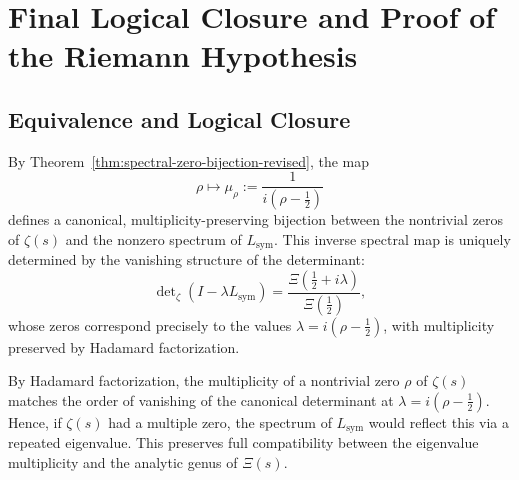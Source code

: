 \section{Final Logical Closure and Proof of the Riemann Hypothesis}
\label{sec:logical-closure}





\subsection{Equivalence and Logical Closure}




\begin{remark}
By Theorem~\ref{thm:spectral-zero-bijection-revised}, the map
\[
\rho \mapsto \mu_\rho := \frac{1}{i(\rho - \tfrac{1}{2})}
\]
defines a canonical, multiplicity-preserving bijection between the nontrivial zeros of \( \zeta(s) \) and the nonzero spectrum of \( L_{\mathrm{sym}} \).
This inverse spectral map is uniquely determined by the vanishing structure of the determinant:
\[
\det\nolimits_{\zeta}(I - \lambda L_{\mathrm{sym}}) = \frac{\Xi(\tfrac{1}{2} + i\lambda)}{\Xi(\tfrac{1}{2})},
\]
whose zeros correspond precisely to the values \( \lambda = i(\rho - \tfrac{1}{2}) \), with multiplicity preserved by Hadamard factorization.
\end{remark}




\begin{remark}
By Hadamard factorization, the multiplicity of a nontrivial zero \( \rho \) of \( \zeta(s) \) matches the order of vanishing of the canonical determinant at \( \lambda = i(\rho - \tfrac{1}{2}) \). Hence, if \( \zeta(s) \) had a multiple zero, the spectrum of \( L_{\mathrm{sym}} \) would reflect this via a repeated eigenvalue.
This preserves full compatibility between the eigenvalue multiplicity and the analytic genus of \( \Xi(s) \).
\end{remark}

